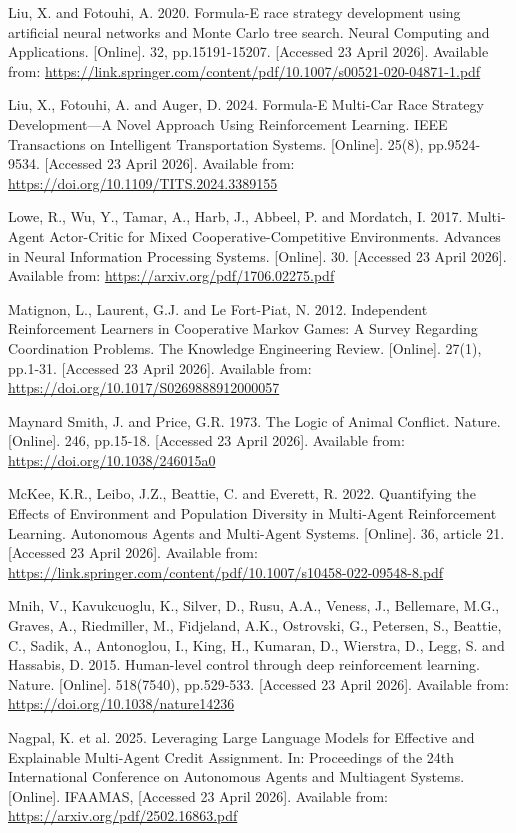 Liu, X. and Fotouhi, A. 2020. Formula-E race strategy development using artificial neural networks and Monte Carlo tree search. Neural Computing and Applications. [Online]. 32, pp.15191-15207. [Accessed 23 April 2026]. Available from: \url{https://link.springer.com/content/pdf/10.1007/s00521-020-04871-1.pdf}

Liu, X., Fotouhi, A. and Auger, D. 2024. Formula-E Multi-Car Race Strategy Development---A Novel Approach Using Reinforcement Learning. IEEE Transactions on Intelligent Transportation Systems. [Online]. 25(8), pp.9524-9534. [Accessed 23 April 2026]. Available from: \url{https://doi.org/10.1109/TITS.2024.3389155}

Lowe, R., Wu, Y., Tamar, A., Harb, J., Abbeel, P. and Mordatch, I. 2017. Multi-Agent Actor-Critic for Mixed Cooperative-Competitive Environments. Advances in Neural Information Processing Systems. [Online]. 30. [Accessed 23 April 2026]. Available from: \url{https://arxiv.org/pdf/1706.02275.pdf}

Matignon, L., Laurent, G.J. and {Le Fort-Piat}, N. 2012. Independent Reinforcement Learners in Cooperative {Markov} Games: A Survey Regarding Coordination Problems. The Knowledge Engineering Review. [Online]. 27(1), pp.1-31. [Accessed 23 April 2026]. Available from: \url{https://doi.org/10.1017/S0269888912000057}

Maynard Smith, J. and Price, G.R. 1973. The Logic of Animal Conflict. Nature. [Online]. 246, pp.15-18. [Accessed 23 April 2026]. Available from: \url{https://doi.org/10.1038/246015a0}

McKee, K.R., Leibo, J.Z., Beattie, C. and Everett, R. 2022. Quantifying the Effects of Environment and Population Diversity in Multi-Agent Reinforcement Learning. Autonomous Agents and Multi-Agent Systems. [Online]. 36, article 21. [Accessed 23 April 2026]. Available from: \url{https://link.springer.com/content/pdf/10.1007/s10458-022-09548-8.pdf}

Mnih, V., Kavukcuoglu, K., Silver, D., Rusu, A.A., Veness, J., Bellemare, M.G., Graves, A., Riedmiller, M., Fidjeland, A.K., Ostrovski, G., Petersen, S., Beattie, C., Sadik, A., Antonoglou, I., King, H., Kumaran, D., Wierstra, D., Legg, S. and Hassabis, D. 2015. Human-level control through deep reinforcement learning. Nature. [Online]. 518(7540), pp.529-533. [Accessed 23 April 2026]. Available from: \url{https://doi.org/10.1038/nature14236}

Nagpal, K. et al. 2025. Leveraging Large Language Models for Effective and Explainable Multi-Agent Credit Assignment. In: Proceedings of the 24th International Conference on Autonomous Agents and Multiagent Systems. [Online]. IFAAMAS, [Accessed 23 April 2026]. Available from: \url{https://arxiv.org/pdf/2502.16863.pdf}


